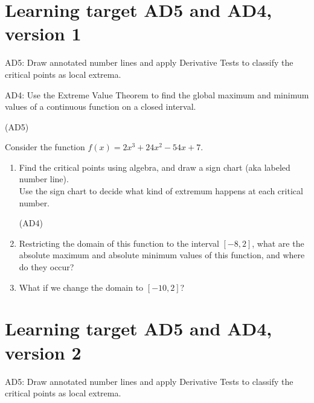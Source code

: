 
\usepackage{pgfplots}


%


\allowdisplaybreaks
\section{Learning target AD5 and AD4, version 1}

AD5: Draw annotated number lines and apply Derivative Tests to classify the critical points as local extrema.

AD4: Use the Extreme Value Theorem to find the global maximum and minimum values of a continuous function on a closed interval.

\hrulefill (AD5)

Consider the function
\(f(x)=2x^{3}+24x^{2}-54x+7\).
	
	\begin{enumerate}[leftmargin=15pt]

		\item Find the critical points using algebra, and draw a sign chart (aka labeled number line). \\
		Use the sign chart to decide what kind of extremum happens at each critical number.

		\vfill
		\vfill
	
		\hrulefill (AD4)
		\item Restricting the domain of this function to the interval $[-8, 2]$, what are the absolute maximum and absolute minimum values of this function, and where do they occur?

		\vfill
	
		
		\item What if we change the domain to $[-10, 2]$?
		
		\vfill
	
	\end{enumerate}

\pagebreak

\section{Learning target AD5 and AD4, version 2}

AD5: Draw annotated number lines and apply Derivative Tests to classify the critical points as local extrema.

